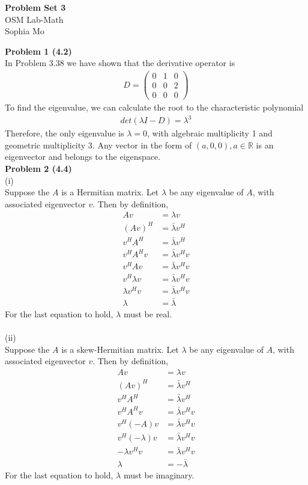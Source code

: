 \documentclass[letterpaper,12pt]{article}
\theoremstyle{definition}
\begin{document}
\begin{flushleft}
  \textbf{\large{Problem Set} 3} \\
  OSM Lab-Math \\
  Sophia Mo
\end{flushleft}

\vspace{5mm}

\noindent\textbf{Problem 1 (4.2)} \\
In Problem 3.38 we have shown that the derivative operator is
\begin{align*}
D =
\begin{pmatrix}
0&1&0\\
0&0&2\\
0&0&0
\end{pmatrix}
\end{align*}
To find the eigenvalue, we can calculate the root to the characteristic polynomial 
\begin{align*}
det(\lambda I - D) = \lambda^3
\end{align*}
Therefore, the only eigenvalue is $\lambda = 0$, with algebraic multiplicity 1 and geometric multiplicity 3. Any vector in the form of $(a, 0, 0), a\in \mathbb{R}$ is an eigenvector and belongs to the eigenspace.\\

\noindent\textbf{Problem 2 (4.4)} \\
(i)\\
Suppose the $A$ is a Hermitian matrix. Let $\lambda$ be any eigenvalue of $A$, with associated eigenvector $v$. Then by definition,
\begin{align*}
Av &= \lambda v\\
(Av)^H &= \bar{\lambda} v^H\\
v^H A^H &= \bar{\lambda} v^H\\
v^HA^Hv &= \bar{\lambda}v^Hv \\
v^H A v &= \bar{\lambda}v^H v\\
v^H \lambda v &=\bar{\lambda} v^H v\\
\lambda v^H v &= \bar{\lambda} v^H v\\
\lambda & = \bar{\lambda}
\end{align*}
For the last equation to hold, $\lambda$ must be real.\\
\\
(ii)\\
Suppose the $A$ is a skew-Hermitian matrix. Let $\lambda$ be any eigenvalue of $A$, with associated eigenvector $v$. Then by definition,
\begin{align*}
Av &= \lambda v\\
(Av)^H &= \bar{\lambda} v^H\\
v^H A^H &= \bar{\lambda} v^H\\
v^HA^Hv &= \bar{\lambda}v^Hv \\
v^H (-A) v &= \bar{\lambda}v^H v\\
v^H (-\lambda) v &=\bar{\lambda} v^H v\\
-\lambda v^H v &= \bar{\lambda} v^H v\\
\lambda & = -\bar{\lambda}
\end{align*}
For the last equation to hold, $\lambda$ must be imaginary.\\
\end{document}
